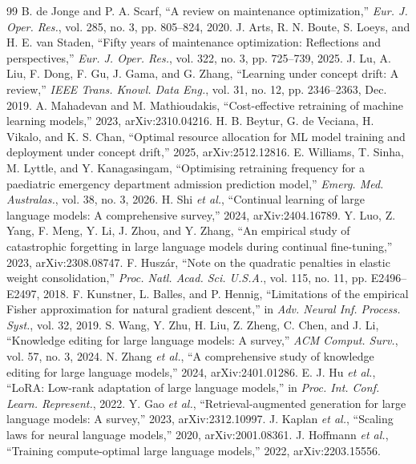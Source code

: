 \documentclass[journal]{IEEEtran}
\begin{document}
\begin{thebibliography}{99}
 B. de Jonge and P. A. Scarf, ``A review on maintenance optimization,'' \emph{Eur. J. Oper. Res.}, vol. 285, no. 3, pp. 805--824, 2020.
 J. Arts, R. N. Boute, S. Loeys, and H. E. van Staden, ``Fifty years of maintenance optimization: Reflections and perspectives,'' \emph{Eur. J. Oper. Res.}, vol. 322, no. 3, pp. 725--739, 2025.
 J. Lu, A. Liu, F. Dong, F. Gu, J. Gama, and G. Zhang, ``Learning under concept drift: A review,'' \emph{IEEE Trans. Knowl. Data Eng.}, vol. 31, no. 12, pp. 2346--2363, Dec. 2019.
 A. Mahadevan and M. Mathioudakis, ``Cost-effective retraining of machine learning models,'' 2023, arXiv:2310.04216.
 H. B. Beytur, G. de Veciana, H. Vikalo, and K. S. Chan, ``Optimal resource allocation for ML model training and deployment under concept drift,'' 2025, arXiv:2512.12816.
 E. Williams, T. Sinha, M. Lyttle, and Y. Kanagasingam, ``Optimising retraining frequency for a paediatric emergency department admission prediction model,'' \emph{Emerg. Med. Australas.}, vol. 38, no. 3, 2026.
 H. Shi \emph{et al.}, ``Continual learning of large language models: A comprehensive survey,'' 2024, arXiv:2404.16789.
 Y. Luo, Z. Yang, F. Meng, Y. Li, J. Zhou, and Y. Zhang, ``An empirical study of catastrophic forgetting in large language models during continual fine-tuning,'' 2023, arXiv:2308.08747.
 F. Huszár, ``Note on the quadratic penalties in elastic weight consolidation,'' \emph{Proc. Natl. Acad. Sci. U.S.A.}, vol. 115, no. 11, pp. E2496--E2497, 2018.
 F. Kunstner, L. Balles, and P. Hennig, ``Limitations of the empirical Fisher approximation for natural gradient descent,'' in \emph{Adv. Neural Inf. Process. Syst.}, vol. 32, 2019.
 S. Wang, Y. Zhu, H. Liu, Z. Zheng, C. Chen, and J. Li, ``Knowledge editing for large language models: A survey,'' \emph{ACM Comput. Surv.}, vol. 57, no. 3, 2024.
 N. Zhang \emph{et al.}, ``A comprehensive study of knowledge editing for large language models,'' 2024, arXiv:2401.01286.
 E. J. Hu \emph{et al.}, ``LoRA: Low-rank adaptation of large language models,'' in \emph{Proc. Int. Conf. Learn. Represent.}, 2022.
 Y. Gao \emph{et al.}, ``Retrieval-augmented generation for large language models: A survey,'' 2023, arXiv:2312.10997.
 J. Kaplan \emph{et al.}, ``Scaling laws for neural language models,'' 2020, arXiv:2001.08361.
 J. Hoffmann \emph{et al.}, ``Training compute-optimal large language models,'' 2022, arXiv:2203.15556.

\end{thebibliography}
\end{document}
